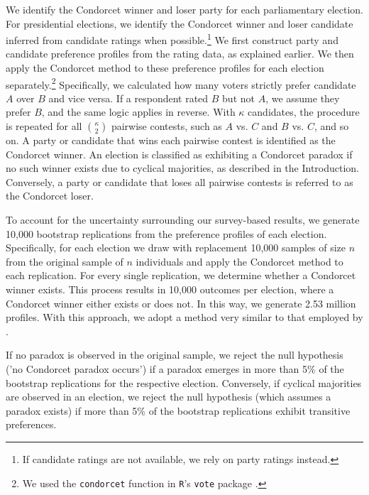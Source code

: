 \documentclass[12pt]{scrartcl}
\newcommand{\nbboostraprep}{2.53 } %
\begin{document}
We identify the Condorcet winner and loser party for each parliamentary election. For presidential elections, we identify the Condorcet winner and loser candidate inferred from candidate ratings when possible.\footnote{
    If candidate ratings are not available, we rely on party ratings instead.
} 
We first construct party and candidate preference profiles from the rating data, as explained earlier. We then apply the Condorcet method to these preference profiles for each election separately.\footnote{
    We used the \texttt{condorcet} function in \texttt{R}'s \texttt{vote} package \citep{vote}.
}  Specifically, we calculated how many voters strictly prefer candidate $A$ over $B$ and vice versa. If a respondent rated $B$ but not $A$, we assume they prefer $B$, and the same logic applies in reverse. %
With $\kappa$ candidates, the procedure is repeated for all $\binom{\kappa}{2}$ pairwise contests, such as $A$ vs. $C$ and $B$ vs. $C$, and so on. A party or candidate that wins each pairwise contest is identified as the Condorcet winner. An election is classified as exhibiting a Condorcet paradox if no such winner exists due to cyclical majorities, as described in the Introduction. Conversely, a party or candidate that loses all pairwise contests is referred to as the Condorcet loser.

To account for the uncertainty surrounding our survey-based results, we generate 10,000 bootstrap replications from the preference profiles of each election. Specifically, for each election we draw with replacement 10,000 samples of size $n$ from the original sample of $n$ individuals and apply the Condorcet method to each replication. For every single replication, we determine whether a Condorcet winner exists. This process results in 10,000 outcomes per election, where a Condorcet winner either exists or does not. In this way, we generate \nbboostraprep million profiles. With this approach, we adopt a method very similar to that employed by \cite{Darmann2019}.

If no paradox is observed in the original sample, we reject the null hypothesis ('no Condorcet paradox occurs') if a paradox emerges in more than 5\% of the bootstrap replications for the respective election. Conversely, if cyclical majorities are observed in an election, we reject the null hypothesis (which assumes a paradox exists) if more than 5\% of the bootstrap replications exhibit transitive preferences. 
\end{document}
